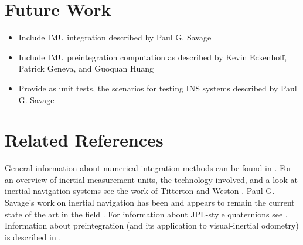 \documentclass[11pt,a4paper]{article}
\begin{document}
\section{Future Work}

\begin{itemize}
	\item
	Include IMU integration described by Paul G. Savage \cite{Savage:1998,Savagep2:1998}
	\item
	Include IMU preintegration computation as described by Kevin Eckenhoff, Patrick Geneva, and Guoquan Huang \cite{Eckenhoff:2016}
	
	\item 
	Provide as unit tests, the scenarios for testing INS systems described by Paul G. Savage \cite{Savage:2009}
\end{itemize}

\section{Related References}

General information about numerical integration methods can be found in \cite{Heath:2002}. For an overview of inertial measurement units, the technology involved, and a look at inertial navigation systems see the work of Titterton and Weston \cite{Titterton:2004}. Paul G. Savage's work on inertial navigation has been and appears to remain the current state of the art in the field \cite{Savage:1998,Savagep2:1998,Savage:2007,Savagep2:2007,Savage:2009}. For information about JPL-style quaternions see \cite{Barfoot:2011,Trawny:2005,NAIF:2003,Shuster:1993}. Information about preintegration (and its application to visual-inertial odometry) is described in \cite{Forster:2017,Forster:2015,Eckenhoff:2016}.



\end{document}
